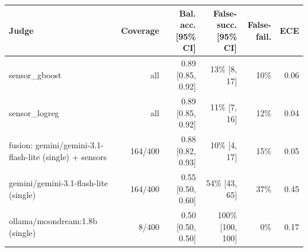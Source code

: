 \begin{tabular}{lrrrrr}
\toprule
Judge & Coverage & Bal. acc. [95\% CI] & False-succ. [95\% CI] & False-fail. & ECE \\
\midrule
sensor\_gboost & all & 0.89 [0.85, 0.92] & 13\% [8, 17] & 10\% & 0.06 \\
sensor\_logreg & all & 0.89 [0.85, 0.92] & 11\% [7, 16] & 12\% & 0.04 \\
fusion: gemini/gemini-3.1-flash-lite (single) + sensors & 164/400 & 0.88 [0.82, 0.93] & 10\% [4, 17] & 15\% & 0.05 \\
gemini/gemini-3.1-flash-lite (single) & 164/400 & 0.55 [0.50, 0.60] & 54\% [43, 65] & 37\% & 0.45 \\
ollama/moondream:1.8b (single) & 8/400 & 0.50 [0.50, 0.50] & 100\% [100, 100] & 0\% & 0.17 \\
\bottomrule
\end{tabular}